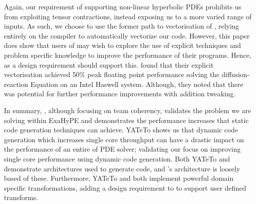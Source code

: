Again, our requirement of supporting non-linear hyperbolic PDEs prohibits us from exploiting tensor contractions, instead exposing us to a more varied range of inputs.
As such, we choose to use the former path to vectorisation of \citeauthor{codegen_dg_SIMD} , relying entirely on the compiler to automatically vectorize our code.
However, this paper does show that users of \phlat may wish to explore the use of explicit techniques and problem specific knowledge to improve the performance of their programs.
Hence, as a design requirement \phlat should support this.
\citeauthor{codegen_dg_SIMD} found that their explicit vectorisation achieved 50\% peak floating point performance solving the diffusion-reaction Equation on an Intel Haswell system.
Although, they noted that there was potential for further performance improvements with addition tweaking.

In summary, \citeauthor{templateExahype}, although focusing on team coherency, validates the problem we are solving within ExaHyPE and demonstrates the performance increases that static code generation techniques can achieve.
YATeTo shows us that dynamic code generation which increases single core throughput can have a drastic impact on the performance of an entire of PDE solver; validating our focus on improving single core performance using dynamic code generation.
Both YATeTo and \citeauthor{codegen_dg_SIMD} demonstrate architectures used to generate code, and \phlat{}'s architecture is loosely based of these.
Furthermore, YATeTo and \citeauthor{codegen_dg_SIMD} both implement powerful domain specific transformations, adding a design requirement to \phlat to support user defined transforms.  